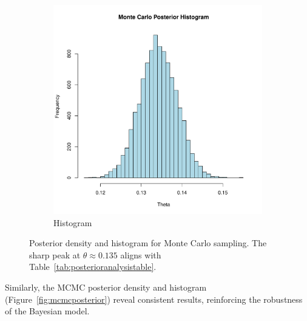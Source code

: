\documentclass[12pt,a4paper]{article}
\begin{document}
\begin{figure}[!ht]
\begin{subfigure}{0.49\textwidth}
        \includegraphics[width=\textwidth]{figures/beta_posterior_histogram.pdf}
        \caption{Histogram}\label{fig:posteriorhistogram}
    \end{subfigure}
    \caption{Posterior density and histogram for Monte Carlo sampling. The sharp peak
    at $\theta \approx 0.135$ aligns with Table~\ref{tab:posterioranalysistable}.}\label{fig:posterior}
\end{figure}

Similarly, the MCMC posterior density and histogram (Figure~\ref{fig:mcmcposterior}) reveal consistent
results, reinforcing the robustness of the Bayesian model.

\newpage
\end{document}
